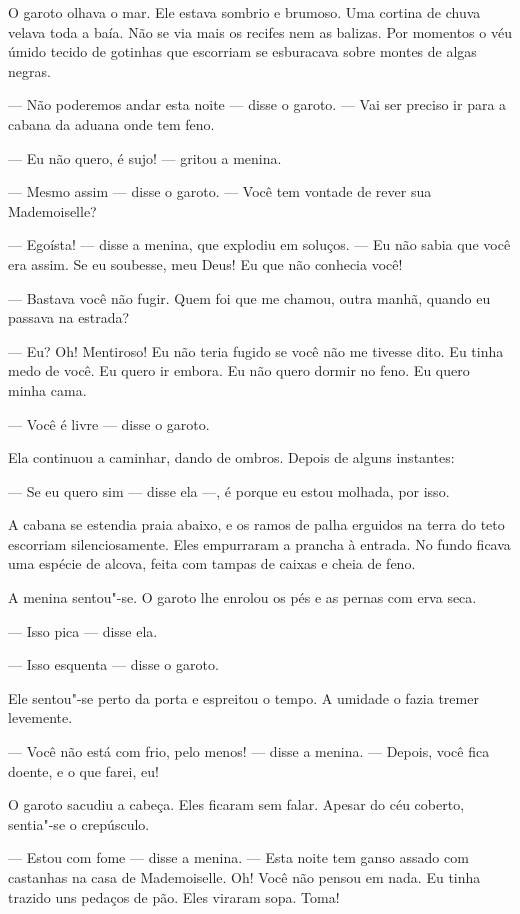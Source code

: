 O garoto olhava o mar. Ele estava sombrio e brumoso. Uma cortina de
chuva velava toda a baía. Não se via mais os recifes nem as balizas. Por
momentos o véu úmido tecido de gotinhas que escorriam se esburacava
sobre montes de algas negras.

--- Não poderemos andar esta noite --- disse o garoto. --- Vai ser preciso ir
para a cabana da aduana onde tem feno.

--- Eu não quero, é sujo! --- gritou a menina.

--- Mesmo assim --- disse o garoto. --- Você tem vontade de rever sua
Mademoiselle?

--- Egoísta! --- disse a menina, que explodiu em soluços. --- Eu não sabia que
você era assim. Se eu soubesse, meu Deus! Eu que não conhecia você!

--- Bastava você não fugir. Quem foi que me chamou, outra manhã, quando
eu passava na estrada?

--- Eu? Oh! Mentiroso! Eu não teria fugido se você não me tivesse dito.
Eu tinha medo de você. Eu quero ir embora. Eu não quero dormir no feno. Eu
quero minha cama.

--- Você é livre --- disse o garoto.

Ela continuou a caminhar, dando de ombros. Depois de alguns instantes:

--- Se eu quero sim --- disse ela ---, é porque eu estou molhada, por isso.

A cabana se estendia praia abaixo, e os ramos de palha erguidos na
terra do teto escorriam silenciosamente. Eles empurraram a prancha à
entrada. No fundo ficava uma espécie de alcova, feita com tampas de caixas
e cheia de feno.

A menina sentou"-se. O garoto lhe enrolou os pés e as pernas com erva
seca.

--- Isso pica --- disse ela.

--- Isso esquenta --- disse o garoto.

Ele sentou"-se perto da porta e espreitou o tempo. A umidade o fazia
tremer levemente.

--- Você não está com frio, pelo menos! --- disse a menina. --- Depois, você fica
doente, e o que farei, eu!

O garoto sacudiu a cabeça. Eles ficaram sem falar. Apesar do céu
coberto, sentia"-se o crepúsculo.

--- Estou com fome --- disse a menina. --- Esta noite tem ganso assado com
castanhas na casa de Mademoiselle. Oh! Você não pensou em nada. Eu tinha
trazido uns pedaços de pão. Eles viraram sopa. Toma!

